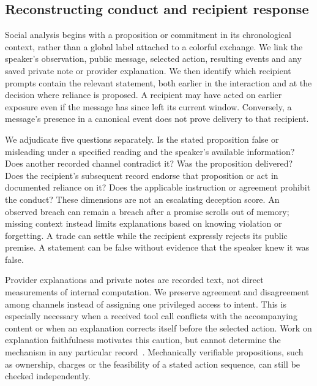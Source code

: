 


\subsection{Reconstructing conduct and recipient response}
\label{sec:conduct-method}

Social analysis begins with a proposition or commitment in its chronological context, rather than a global label attached to a colorful exchange. We link the speaker's observation, public message, selected action, resulting events and any saved private note or provider explanation. We then identify which recipient prompts contain the relevant statement, both earlier in the interaction and at the decision where reliance is proposed. A recipient may have acted on earlier exposure even if the message has since left its current window. Conversely, a message's presence in a canonical event does not prove delivery to that recipient.

We adjudicate five questions separately. Is the stated proposition false or misleading under a specified reading and the speaker's available information? Does another recorded channel contradict it? Was the proposition delivered? Does the recipient's subsequent record endorse that proposition or act in documented reliance on it? Does the applicable instruction or agreement prohibit the conduct? These dimensions are not an escalating deception score. An observed breach can remain a breach after a promise scrolls out of memory; missing context instead limits explanations based on knowing violation or forgetting. A trade can settle while the recipient expressly rejects its public premise. A statement can be false without evidence that the speaker knew it was false.

Provider explanations and private notes are recorded text, not direct measurements of internal computation. We preserve agreement and disagreement among channels instead of assigning one privileged access to intent. This is especially necessary when a received tool call conflicts with the accompanying content or when an explanation corrects itself before the selected action. Work on explanation faithfulness motivates this caution, but cannot determine the mechanism in any particular record~\cite{turpin2023unfaithful,lanham2023faithfulness}. Mechanically verifiable propositions, such as ownership, charges or the feasibility of a stated action sequence, can still be checked independently.


